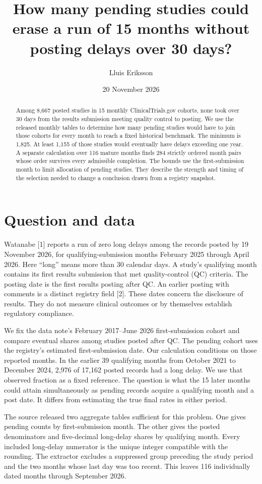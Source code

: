 \documentclass[11pt]{article}
\title{How many pending studies could erase a run of 15 months without posting delays over 30 days?}
\author{Lluis Eriksson}\date{20 November 2026}
\begin{document}
\maketitle
\begin{abstract}
Among 8,667 posted studies in 15 monthly ClinicalTrials.gov cohorts, none took over 30 days from the results submission meeting quality control to posting. We use the released monthly tables to determine how many pending studies would have to join those cohorts for every month to reach a fixed historical benchmark. The minimum is 1,825. At least 1,155 of those studies would eventually have delays exceeding one year. A separate calculation over 116 mature months finds 284 strictly ordered month pairs whose order survives every admissible completion. The bounds use the first-submission month to limit allocation of pending studies. They describe the strength and timing of the selection needed to change a conclusion drawn from a registry snapshot.
\end{abstract}
\section{Question and data}
Watanabe [1] reports a run of zero long delays among the records posted by 19 November 2026, for qualifying-submission months February 2025 through April 2026. Here ``long'' means more than 30 calendar days. A study's qualifying month contains its first results submission that met quality-control (QC) criteria. The posting date is the first results posting after QC. An earlier posting with comments is a distinct registry field [2]. These dates concern the disclosure of results. They do not measure clinical outcomes or by themselves establish regulatory compliance.

We fix the data note's February 2017--June 2026 first-submission cohort and compare eventual shares among studies posted after QC. The pending cohort uses the registry's estimated first-submission date. Our calculation conditions on those reported months. In the earlier 39 qualifying months from October 2021 to December 2024, 2,976 of 17,162 posted records had a long delay. We use that observed fraction as a fixed reference. The question is what the 15 later months could attain simultaneously as pending records acquire a qualifying month and a post date. It differs from estimating the true final rates in either period.

The source released two aggregate tables sufficient for this problem. One gives pending counts by first-submission month. The other gives the posted denominators and five-decimal long-delay shares by qualifying month. Every included long-delay numerator is the unique integer compatible with the rounding. The extractor excludes a suppressed group preceding the study period and the two months whose last day was too recent. This leaves 116 individually dated months through September 2026.
\newpage
\end{document}
